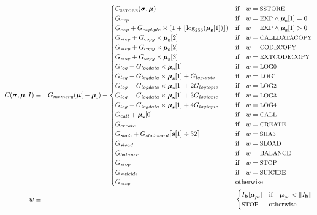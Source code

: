 \documentclass[9pt,oneside]{amsart}
\begin{document}
\begin{eqnarray}
C(\boldsymbol{\sigma}, \boldsymbol{\mu}, I) & \equiv & G_{memory}(\boldsymbol{\mu}'_i - \boldsymbol{\mu}_i) + \begin{cases}
C_\text{\tiny SSTORE}(\boldsymbol{\sigma}, \boldsymbol{\mu}) & \text{if} \quad w = \text{\small SSTORE} \\
G_{exp} & \text{if} \quad w = \text{\small EXP} \wedge \boldsymbol{\mu}_\mathbf{s}[1] = 0 \\
G_{exp} + G_{expbyte}\times(1+\lfloor\log_{256}(\boldsymbol{\mu}_\mathbf{s}[1])\rfloor) & \text{if} \quad w = \text{\small EXP} \wedge \boldsymbol{\mu}_\mathbf{s}[1] > 0 \\
G_{step} + G_{copy}\times\boldsymbol{\mu}_\mathbf{s}[2] & \text{if} \quad w = \text{\small CALLDATACOPY} \\
G_{step} + G_{copy}\times\boldsymbol{\mu}_\mathbf{s}[2] & \text{if} \quad w = \text{\small CODECOPY} \\
G_{step} + G_{copy}\times\boldsymbol{\mu}_\mathbf{s}[3] & \text{if} \quad w = \text{\small EXTCODECOPY} \\
G_{log}+G_{logdata}\times\boldsymbol{\mu}_\mathbf{s}[1] & \text{if} \quad w = \text{\small LOG0} \\
G_{log}+G_{logdata}\times\boldsymbol{\mu}_\mathbf{s}[1]+G_{logtopic} & \text{if} \quad w = \text{\small LOG1} \\
G_{log}+G_{logdata}\times\boldsymbol{\mu}_\mathbf{s}[1]+2G_{logtopic} & \text{if} \quad w = \text{\small LOG2} \\
G_{log}+G_{logdata}\times\boldsymbol{\mu}_\mathbf{s}[1]+3G_{logtopic} & \text{if} \quad w = \text{\small LOG3} \\
G_{log}+G_{logdata}\times\boldsymbol{\mu}_\mathbf{s}[1]+4G_{logtopic} & \text{if} \quad w = \text{\small LOG4} \\
G_{call} + \boldsymbol{\mu}_\mathbf{s}[0] & \text{if} \quad w = \text{\small CALL}\\
G_{create} & \text{if} \quad w = \text{\small CREATE}\\
G_{sha3}+G_{sha3word} \lceil \mathbf{s}[1] \div 32 \rceil & \text{if} \quad w = \text{\small SHA3}\\
G_{sload} & \text{if} \quad w = \text{\small SLOAD}\\
G_{balance} & \text{if} \quad w = \text{\small BALANCE}\\
G_{stop} & \text{if} \quad w = \text{\small STOP}\\
G_{suicide} & \text{if} \quad w = \text{\small SUICIDE}\\
G_{step} & \text{otherwise}
\end{cases} \\
w & \equiv & \begin{cases} I_\mathbf{b}[\boldsymbol{\mu}_{pc}] & \text{if} \quad \boldsymbol{\mu}_{pc} < \lVert I_\mathbf{b} \rVert \\
\text{\small STOP} & \text{otherwise}
\end{cases}
\end{eqnarray}
\end{document}
